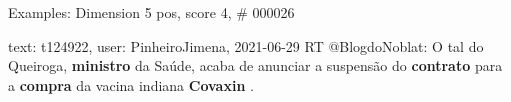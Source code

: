 \begin{frame}{Examples: Dimension 5 pos, score 4, \# 000026}
\footnotesize
\begin{exampleblock}{text: t124922, user: PinheiroJimena, 2021-06-29}
RT @BlogdoNoblat: O tal do Queiroga, \textbf{ministro} da Saúde, acaba de 
anunciar a suspensão do \textbf{contrato} para a \textbf{compra} da vacina 
indiana \textbf{Covaxin} . 
\end{exampleblock}
\end{frame}

